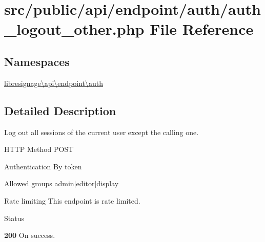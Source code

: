 \hypertarget{src_2public_2api_2endpoint_2auth_2auth__logout__other_8php}{}\section{src/public/api/endpoint/auth/auth\+\_\+logout\+\_\+other.php File Reference}
\label{src_2public_2api_2endpoint_2auth_2auth__logout__other_8php}
\subsection*{Namespaces}
\begin{DoxyCompactItemize}
\item 
 \hyperlink{namespacelibresignage_1_1api_1_1endpoint_1_1auth}{libresignage\textbackslash{}api\textbackslash{}endpoint\textbackslash{}auth}
\end{DoxyCompactItemize}


\subsection{Detailed Description}
Log out all sessions of the current user except the calling one.

\begin{DoxyParagraph}{H\+T\+TP Method}
P\+O\+ST 
\end{DoxyParagraph}
\begin{DoxyParagraph}{Authentication}
By token 
\end{DoxyParagraph}
\begin{DoxyParagraph}{Allowed groups}
{\ttfamily admin$\vert$editor$\vert$display} 
\end{DoxyParagraph}
\begin{DoxyParagraph}{Rate limiting}
This endpoint is rate limited.
\end{DoxyParagraph}
\begin{DoxyParagraph}{Status}

\begin{DoxyItemize}
\item {\bfseries 200} On success. 
\end{DoxyItemize}
\end{DoxyParagraph}
